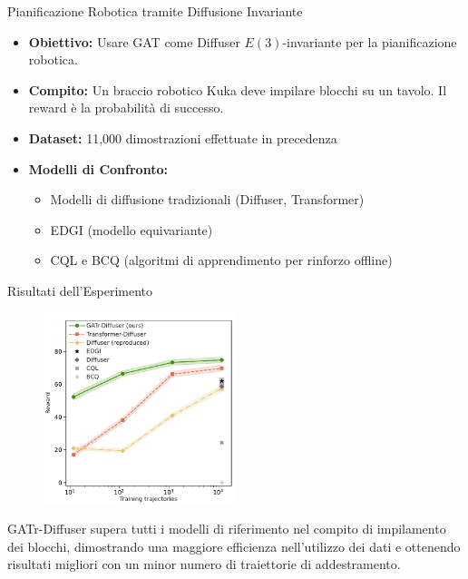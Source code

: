 \begin{frame}{Pianificazione Robotica tramite Diffusione Invariante}
    \begin{itemize}
        \item \textbf{Obiettivo:} Usare GAT come Diffuser \(E(3)\)-invariante per 
        la pianificazione robotica. 
        \item \textbf{Compito:} Un braccio robotico Kuka deve impilare blocchi su un 
        tavolo. Il reward è la probabilità di successo.
        \item \textbf{Dataset:} 11,000 dimostrazioni effettuate in precedenza
        \item \textbf{Modelli di Confronto:}
        \begin{itemize}
            \item Modelli di diffusione tradizionali (Diffuser, Transformer)
            \item EDGI (modello equivariante)
            \item CQL e BCQ (algoritmi di apprendimento per rinforzo offline)
        \end{itemize}
    \end{itemize}
    
\end{frame}
    
\begin{frame}{Risultati dell'Esperimento}
    \begin{figure}
        \centering
        \includegraphics[width=0.5\textwidth]{../Images/Kena.png}
    \end{figure}

    GATr-Diffuser supera tutti i modelli di riferimento nel compito di impilamento dei 
    blocchi, dimostrando una maggiore efficienza nell'utilizzo dei dati e ottenendo 
    risultati migliori con un minor numero di traiettorie di addestramento.
\end{frame}
    
